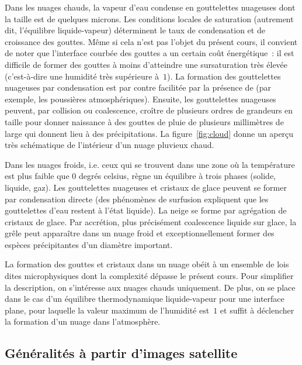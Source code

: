 \begin{finger}
\item Dans les nuages chauds, la vapeur d'eau condense en gouttelettes nuageuses dont la taille est de quelques microns. Les conditions locales de saturation (autrement dit, l'équilibre liquide-vapeur) déterminent le taux de condensation et de croissance des gouttes. Même si cela n'est pas l'objet du présent cours, il convient de noter que l'interface courbée des gouttes a un certain coût énergétique~: il est difficile de former des gouttes à moins d'atteindre une sursaturation très élevée (c'est-à-dire une humidité très supérieure à~$1$). La formation des gouttelettes nuageuses par condensation est par contre facilitée par la présence de  (par exemple, les poussières atmosphériques). Ensuite, les gouttelettes nuageuses peuvent, par collision ou coalescence, croître de plusieurs ordres de grandeurs en taille pour donner naissance à des gouttes de pluie de plusieurs millimètres de large qui donnent lieu à des précipitations. La figure~\ref{fig:cloud} donne un aperçu très schématique de l'intérieur d'un nuage pluvieux chaud.
\item Dans les nuages froids, i.e. ceux qui se trouvent dans une zone où la température est plus faible que 0 degrés celsius, règne un équilibre à trois phases (solide, liquide, gaz). Les gouttelettes nuageuses et cristaux de glace peuvent se former par condensation directe (des phénomènes de surfusion expliquent que les gouttelettes d'eau restent à l'état liquide). La neige se forme par agrégation de cristaux de glace. Par accrétion, plus précisément coalescence liquide sur glace, la grêle peut apparaître dans un nuage froid et exceptionnellement former des espèces précipitantes d'un diamètre important.
\end{finger}

\sk
La formation des gouttes et cristaux dans un nuage obéit à un ensemble de lois dites microphysiques dont la complexité dépasse le présent cours. Pour simplifier la description, on s'intéresse aux nuages chauds uniquement. De plus, on se place dans le cas d'un équilibre thermodynamique liquide-vapeur pour une interface plane, pour laquelle la valeur maximum de l'humidité est~$1$ et suffit à déclencher la formation d'un nuage dans l'atmosphère.
 
\sk
\subsection{Généralités à partir d'images satellite}

